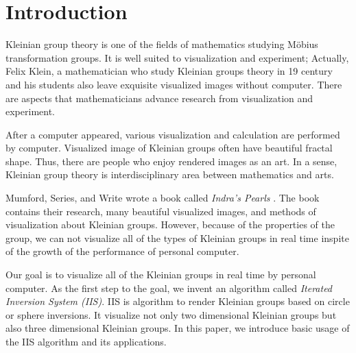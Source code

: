

\section{Introduction}

Kleinian group theory is one of the fields of mathematics studying 
M\"obius transformation groups.
It is well suited to visualization and experiment;
Actually, Felix Klein, a mathematician who study Kleinian groups theory
in 19 century and his students also leave exquisite visualized images
without computer.
There are aspects that mathematicians advance research from
visualization and experiment.

After a computer appeared, various visualization and calculation are
performed by computer.
Visualized image of Kleinian groups often have beautiful fractal shape.
Thus, there are people who enjoy rendered images as an art.
In a sense, Kleinian group theory is interdisciplinary area between
mathematics and arts.

Mumford, Series, and Write wrote a book called
\textit{Indra's Pearls} \cite{MumfordSeriesWright200204}.
The book contains their research, many beautiful visualized images, and
methods of visualization about Kleinian groups.
However, because of the properties of the group, we can not
visualize all of the types of Kleinian groups in real time
inspite of the growth of the performance of personal computer.

Our goal is to visualize all of the Kleinian groups in real time by
personal computer.
As the first step to the goal, we invent an algorithm called
\textit{Iterated Inversion System (IIS)}.
IIS is algorithm to render Kleinian groups based on circle or sphere
inversions.
It visualize not only two dimensional Kleinian groups but also three
dimensional Kleinian groups.
In this paper, we introduce basic usage of the IIS algorithm and its
applications.



